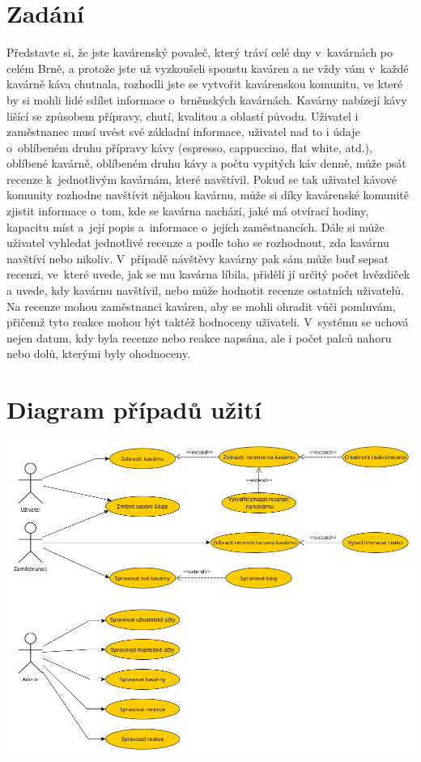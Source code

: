\documentclass[a4paper, 11pt]{article}
\begin{document}
\section{Zadání}
Představte si, že jste kavárenský povaleč, který tráví celé dny v~kavárnách po celém Brně,
a protože jste už vyzkoušeli spoustu kaváren a ne vždy vám v~každé kavárně káva chutnala,
rozhodli jste se vytvořit kavárenskou komunitu, ve které by si mohli lidé sdílet informace
o~brněnských kavárnách. Kavárny nabízejí kávy lišící se způsobem přípravy, chutí, kvalitou a oblastí původu.
Uživatel i zaměstnanec musí uvést své základní informace, uživatel nad to i údaje o~oblíbeném druhu
přípravy kávy (espresso, cappuccino, flat white, atd.), oblíbené kavárně, oblíbeném druhu
kávy a počtu vypitých káv denně, může psát recenze k~jednotlivým kavárnám, které navštívil.
Pokud se tak uživatel kávové komunity rozhodne navštívit nějakou kavárnu, může si díky kavárenské
komunitě zjistit informace o~tom, kde se kavárna nachází, jaké má otvírací hodiny, kapacitu míst
a~její popis a~informace o~jejích zaměstnancích. Dále si může uživatel vyhledat jednotlivé recenze
a podle toho se rozhodnout, zda kavárnu navštíví nebo nikoliv. V~případě návštěvy kavárny pak sám může
buď sepsat recenzi, ve~které uvede, jak se mu kavárna líbila, přidělí jí určitý počet hvězdiček a uvede,
kdy kavárnu navštívil, nebo může hodnotit recenze ostatních uživatelů. Na recenze mohou zaměstnanci kaváren,
aby se mohli ohradit vůči pomluvám, přičemž tyto reakce mohou být taktéž hodnoceny uživateli.
V~systému se uchová nejen datum, kdy byla recenze nebo reakce napsána, ale i počet palců nahoru nebo dolů,
kterými byly ohodnoceny.

\section{Diagram případů užití}

\begin{center}
			\includegraphics[width=1\linewidth]{./IDS_UCD.png} \\
            \label{UCD}
\end{center}
\end{document}
